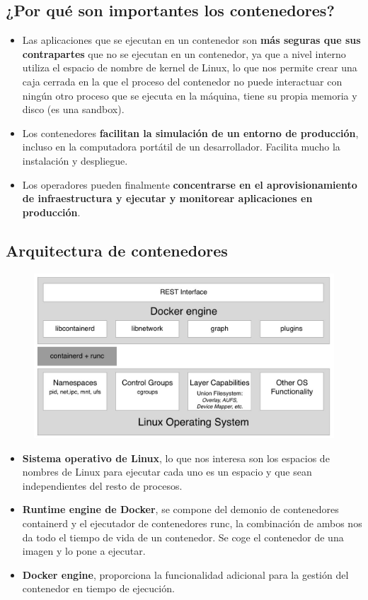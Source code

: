 \documentclass[12pt, twoside, openright]{report} %
\begin{document}
\subsection{¿Por qué son importantes los contenedores?}
\begin{itemize}
	\item Las aplicaciones que se ejecutan en un contenedor son \textbf{más seguras que sus contrapartes} que no se ejecutan en un contenedor, ya que a nivel interno utiliza el espacio de nombre de kernel de Linux, lo que nos permite crear una caja cerrada en la que el proceso del contenedor no puede interactuar con ningún otro proceso que se ejecuta en la máquina, tiene su propia memoria y disco (es una sandbox).

	\item Los contenedores \textbf{facilitan la simulación de un entorno de producción}, incluso en la computadora portátil de un desarrollador.
	      Facilita mucho la instalación y despliegue.

	\item Los operadores pueden finalmente \textbf{concentrarse en el aprovisionamiento de infraestructura y ejecutar y monitorear aplicaciones en producción}.
\end{itemize}

\subsection{Arquitectura de contenedores}
\begin{figure}[H]
	{\includegraphics[scale=.4]{default.jpg}}
\end{figure}
\begin{itemize}
	\item \textbf{Sistema operativo de Linux}, lo que nos interesa son los espacios de nombres de Linux para ejecutar cada uno es un espacio y que sean independientes del resto de procesos.
	\item \textbf{Runtime engine de Docker}, se compone del demonio de contenedores containerd y el ejecutador de contenedores runc, la combinación de ambos nos da todo el tiempo de vida de un contenedor. Se coge el contenedor de una imagen y lo pone a ejecutar.
	\item \textbf{Docker engine}, proporciona la funcionalidad adicional para la gestión del contenedor en tiempo de ejecución.
\end{itemize}
\end{document}
